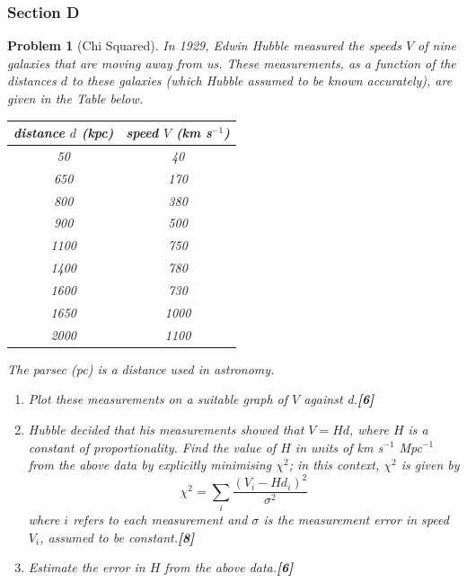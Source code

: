 \documentclass[a4paper]{article}
\theoremstyle{new}
\newtheorem{qns}{Problem}[subsection]
\begin{document}
\subsubsection{Section D}
\begin{qns}[Chi Squared]
In 1929, Edwin Hubble measured the speeds $V$ of nine galaxies that are moving away from us. These measurements, as a function of the distances $d$ to these galaxies (which Hubble assumed to be known accurately), are given in the Table below.
\begin{center}
\begin{tabular}{ c c }
distance $d$ (kpc) & speed $V$ (km s$^{-1}$)\\
\hline
50 & 40\\
650 & 170\\
800 & 380\\
900 & 500\\
1100 & 750\\
1400 & 780\\
1600 & 730\\
1650 & 1000\\
2000 & 1100
\end{tabular}
\end{center}
The parsec (pc) is a distance used in astronomy.
\begin{enumerate}[label=(\roman*)]
\item Plot these measurements on a suitable graph of $V$ against d.\hfill\textbf{[6]}
\item Hubble decided that his measurements showed that $V=Hd$, where $H$ is a constant of proportionality. Find the value of $H$ in units of km s$^{-1}$ Mpc$^{-1}$ from the above data by explicitly minimising $\chi^2$; in this context, $\chi^2$ is given by
$$\chi^2=\sum_i\frac{(V_i-Hd_i)^2}{\sigma^2}$$
where $i$ refers to each measurement and $\sigma$ is the measurement error in speed $V_i$, assumed to be constant.\hfill\textbf{[8]}
\item Estimate the error in $H$ from the above data.\hfill\textbf{[6]}
\end{enumerate}
\end{qns}
\end{document}
